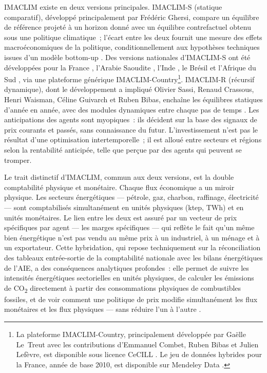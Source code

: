 IMACLIM existe en deux versions principales. IMACLIM-S (statique comparatif), développé principalement par Frédéric Ghersi, compare un équilibre de référence projeté à un horizon donné avec un équilibre contrefactuel obtenu sous une politique climatique~; l'écart entre les deux fournit une mesure des effets macroéconomiques de la politique, conditionnellement aux hypothèses techniques issues d'un modèle bottom-up \parencite{ghersi_hybrid_2015}. Des versions nationales d'IMACLIM-S ont été développées pour la France \parencite{combet_fiscalite_2013, letreut_methodological_2017}, l'Arabie Saoudite \parencite{soummane_imaclim-sau_2020}, l'Inde \parencite{gupta_imaclim-ind_2018}, le Brésil \parencite{lefevre_hybridization_2016} et l'Afrique du Sud \parencite{schers_green_2015}, via une plateforme générique IMACLIM-Country\footnote{La plateforme IMACLIM-Country, principalement développée par Gaëlle Le~Treut avec les contributions d'Emmanuel Combet, Ruben Bibas et Julien Lefèvre, est disponible sous licence CeCILL \parencite{letreut_imaclim-country_2019}. Le jeu de données hybrides pour la France, année de base 2010, est disponible sur Mendeley Data \parencite{letreut_hybrid_2018}.}. IMACLIM-R (récursif dynamique), dont le développement a impliqué Olivier Sassi, Renaud Crassous, Henri Waisman, Céline Guivarch et Ruben Bibas, enchaîne les équilibres statiques d'année en année, avec des modules dynamiques entre chaque pas de temps \parencite{bibas_imaclim-r_2016}. Les anticipations des agents sont myopiques~: ils décident sur la base des signaux de prix courants et passés, sans connaissance du futur. L'investissement n'est pas le résultat d'une optimisation intertemporelle~; il est alloué entre secteurs et régions selon la rentabilité anticipée, telle que perçue par des agents qui peuvent se tromper.

Le trait distinctif d'IMACLIM, commun aux deux versions, est la double comptabilité physique et monétaire. Chaque flux économique a un miroir physique. Les secteurs énergétiques --- pétrole, gaz, charbon, raffinage, électricité --- sont comptabilisés simultanément en unités physiques (ktep, TWh) et en unités monétaires. Le lien entre les deux est assuré par un vecteur de prix spécifiques par agent --- les \og marges spécifiques\fg{} --- qui reflète le fait qu'un même bien énergétique n'est pas vendu au même prix à un industriel, à un ménage et à un exportateur. Cette hybridation, qui repose techniquement sur la réconciliation des tableaux entrée-sortie de la comptabilité nationale avec les bilans énergétiques de l'AIE, a des conséquences analytiques profondes~: elle permet de suivre les intensités énergétiques sectorielles en unités physiques, de calculer les émissions de CO\textsubscript{2} directement à partir des consommations physiques de combustibles fossiles, et de voir comment une politique de prix modifie simultanément les flux monétaires et les flux physiques --- sans réduire l'un à l'autre \parencite{combet_construction_2014}.



